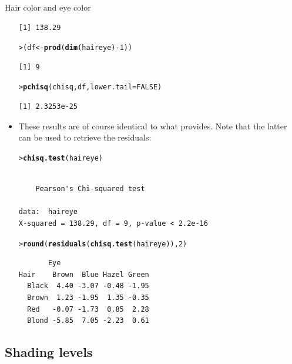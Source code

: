 \documentclass[10pt,krantz2]{krantz}\usepackage[]{graphicx}\usepackage[]{color}
\makeatletter
\newcommand{\hlnum}[1]{\textcolor[rgb]{0.686,0.059,0.569}{#1}}%
\newcommand{\hlopt}[1]{\textcolor[rgb]{0,0,0}{#1}}%
\newcommand{\hlstd}[1]{\textcolor[rgb]{0.345,0.345,0.345}{#1}}%
\newcommand{\hlkwb}[1]{\textcolor[rgb]{0.69,0.353,0.396}{#1}}%
\newcommand{\hlkwc}[1]{\textcolor[rgb]{0.333,0.667,0.333}{#1}}%
\newcommand{\hlkwd}[1]{\textcolor[rgb]{0.737,0.353,0.396}{\textbf{#1}}}%
\newenvironment{kframe}{%
 \def\at@end@of@kframe{}%
 \ifinner\ifhmode%
  \def\at@end@of@kframe{\end{minipage}}%
  \begin{minipage}{\columnwidth}%
 \fi\fi%
 \def\FrameCommand##1{\hskip\@totalleftmargin \hskip-\fboxsep
 \colorbox{shadecolor}{##1}\hskip-\fboxsep
     \hskip-\linewidth \hskip-\@totalleftmargin \hskip\columnwidth}%
 \MakeFramed {\advance\hsize-\width
   \@totalleftmargin\z@ \linewidth\hsize
   \@setminipage}}%
 {\par\unskip\endMakeFramed%
 \at@end@of@kframe}
\newenvironment{knitrout}{}{} %
\renewenvironment{knitrout}{\small\renewcommand{\baselinestretch}{.85}}{} %
\makeatother
\begin{document}
\begin{Example}[haireye2a]{Hair color and eye color}
\begin{itemize}
\begin{knitrout}
\begin{kframe}
\begin{verbatim}
[1] 138.29
\end{verbatim}
\begin{alltt}
\hlstd{> }\hlstd{(df} \hlkwb{<-} \hlkwd{prod}\hlstd{(}\hlkwd{dim}\hlstd{(haireye)} \hlopt{-} \hlnum{1}\hlstd{))}
\end{alltt}
\begin{verbatim}
[1] 9
\end{verbatim}
\begin{alltt}
\hlstd{> }\hlkwd{pchisq}\hlstd{(chisq, df,} \hlkwc{lower.tail} \hlstd{=} \hlnum{FALSE}\hlstd{)}
\end{alltt}
\begin{verbatim}
[1] 2.3253e-25
\end{verbatim}
\end{kframe}
\end{knitrout}
\item These results are of course identical to what 
  provides. Note that the latter can be used to retrieve the residuals:
\begin{knitrout}
\color{fgcolor}\begin{kframe}
\begin{alltt}
\hlstd{> }\hlkwd{chisq.test}\hlstd{(haireye)}
\end{alltt}
\begin{verbatim}

	Pearson's Chi-squared test

data:  haireye
X-squared = 138.29, df = 9, p-value < 2.2e-16
\end{verbatim}
\begin{alltt}
\hlstd{> }\hlkwd{round}\hlstd{(}\hlkwd{residuals}\hlstd{(}\hlkwd{chisq.test}\hlstd{(haireye)),} \hlnum{2}\hlstd{)}
\end{alltt}
\begin{verbatim}
       Eye
Hair    Brown  Blue Hazel Green
  Black  4.40 -3.07 -0.48 -1.95
  Brown  1.23 -1.95  1.35 -0.35
  Red   -0.07 -1.73  0.85  2.28
  Blond -5.85  7.05 -2.23  0.61
\end{verbatim}
\end{kframe}
\end{knitrout}
\end{itemize}
\end{Example}

\subsection{Shading levels}
\end{document}
